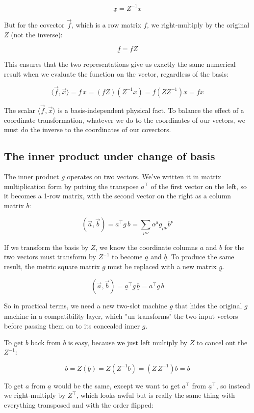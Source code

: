 $$
\underline{x} = Z^{-1} x
$$

But for the covector $\vec{f}$, which is a row matrix $f$, we right-multiply by the original $Z$ (not the inverse):

$$
\underline{f} = f Z
$$

This ensures that the two representations give us exactly the same numerical result when we evaluate the function on the vector, regardless of the basis:

$$
\langle \vec{f}, \vec{x} \rangle = \underline{f} \, \underline{x} = (f Z) (Z^{-1} x) = f (Z Z^{-1}) x = fx
$$

The scalar $\langle \vec{f}, \vec{x} \rangle$ is a basis-independent physical fact. To balance the effect of a coordinate transformation, whatever we do to the coordinates of our vectors, we must do the inverse to the coordinates of our covectors.

\subsection{The inner product under change of basis}

The inner product $g$ operates on two vectors. We've written it in matrix multiplication form by putting the transpose $a^\intercal$ of the first vector on the left, so it becomes a 1-row matrix, with the second vector on the right as a column matrix $b$:

$$
(\vec{a}, \vec{b}) = a^\intercal g\, b = \sum_{\mu\nu} a^{\mu} g_{\mu\nu} b^{\nu}
$$

If we transform the basis by $Z$, we know the coordinate columns $a$ and $b$ for the two vectors must transform by $Z^{-1}$ to become $\underline{a}$ and $\underline{b}$. To produce the same result, the metric square matrix $g$ must be replaced with a new matrix $\underline{g}$. 

$$
(\vec{a}, \vec{b}) = \underline{a}^\intercal \underline{g}\, \underline{b} = a^\intercal g\, b
$$

So in practical terms, we need a new two-slot machine $\underline{g}$ that hides the original $g$ machine in a compatibility layer, which "un-transforms" the two input vectors before passing them on to its concealed inner $g$.

To get $b$ back from $\underline{b}$ is easy, because we just left multiply by $Z$ to cancel out the $Z^{-1}$:

$$
b = Z(\underline{b}) = Z(Z^{-1}b) = (Z\,Z^{-1})b = b
$$

To get $a$ from $\underline{a}$ would be the same, except we want to get $a^\intercal$ from $\underline{a}^\intercal$, so instead we right-multiply by $Z^\intercal$, which looks awful but is really the same thing with everything transposed and with the order flipped:

